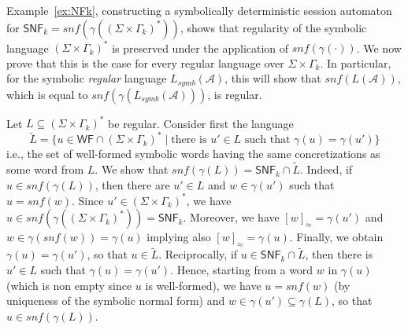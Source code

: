 \documentclass{LMCS}
\def\A{\mathcal A}
\def\concretization{\gamma}
\newcommand{\kNat}[1]{\Gamma_{#1}}
\newcommand{\symbL}{L_\mathit{symb}}
\newcommand{\snf}{\mathit{snf}}
\newcommand{\WF}{\mathsf{WF}}
\newcommand\NF{\mathsf{SNF}}
\begin{document}
  Example~\ref{ex:NFk}, constructing a symbolically deterministic
  session automaton for $\NF_k=\snf(\concretization((\Sigma\times
  \kNat k)^\ast))$, shows that regularity of the symbolic language
  $(\Sigma\times \kNat{k})^{*}$ is preserved under the application of
  $\snf(\concretization(\cdot))$. We now prove that this is the case
  for every regular language over $\Sigma \times \Gamma_{k}$. In
  particular, for the symbolic \emph{regular} language $\symbL(\A)$,
  this will show that $\snf(L(\A))$, which is equal to
  $\snf(\concretization(\symbL(\A)))$, is regular.

  Let $L \subseteq (\Sigma \times \Gamma_k)^\ast$ be regular.
  Consider first the language
  \[\tilde L = \{u\in\WF \cap (\Sigma \times
  \Gamma_k)^\ast \mid \text{there is } u'\in L \text{ such that }
  \concretization(u)=\concretization(u')\}\] i.e., the set of well-formed symbolic words having the same
  concretizations as some word from $L$.  We show that
  $\snf(\concretization(L)) = \NF_{k}\cap \tilde L$.  Indeed, if
  $u\in\snf(\concretization(L))$, then there are $u'\in L$ and
  $w\in\concretization(u')$ such that $u=\snf(w)$. Since
  $u'\in(\Sigma\times\kNat k)^\ast$, we have
  $u\in\snf(\concretization((\Sigma\times \kNat k)^\ast))=\NF_k$.
  Moreover, we have $[w]_{\approx} = \concretization(u')$ and
  $w\in\concretization(\snf(w))=\concretization(u)$ implying also
  $[w]_{\approx}=\concretization(u)$.  Finally, we obtain
  $\concretization(u)=\concretization(u')$, so that $u\in \tilde L$.
  Reciprocally, if $u\in\NF_{k} \mathrel{\cap} \tilde L$, then there
  is $u'\in L$ such that
  $\concretization(u)=\concretization(u')$. Hence, starting from a
  word $w$ in $\concretization(u)$ (which is non empty since $u$ is
  well-formed), we have $u=\snf(w)$ (by uniqueness of the symbolic
  normal form) and $w\in\concretization(u')\subseteq
  \concretization(L)$, so that $u\in\snf(\concretization(L))$.
\end{document}
